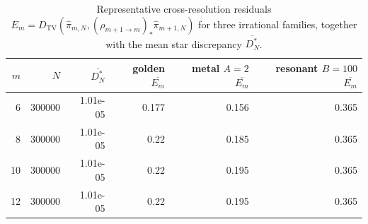 \begin{table}[H]
\centering
\scriptsize
\setlength{\tabcolsep}{4pt}
\caption{Representative cross-resolution residuals
$E_m=D_{\mathrm{TV}}(\hat\pi_{m,N},(\rho_{m+1\to m})_*\hat\pi_{m+1,N})$ for
three irrational families, together with the mean star discrepancy
$\overline{D_N^*}$.}
\label{tab:rotation_multiscale_residual_summary}
\begin{tabular}{rrrrrr}
\toprule
$m$ & $N$ & $\overline{D_N^*}$ & golden $\overline{E_m}$ & metal $A=2$ $\overline{E_m}$ & resonant $B=100$ $\overline{E_m}$\\
\midrule
6 & 300000 & 1.01e-05 & 0.177 & 0.156 & 0.365\\
8 & 300000 & 1.01e-05 & 0.22 & 0.185 & 0.365\\
10 & 300000 & 1.01e-05 & 0.22 & 0.195 & 0.365\\
12 & 300000 & 1.01e-05 & 0.22 & 0.195 & 0.365\\
\bottomrule
\end{tabular}
\end{table}
